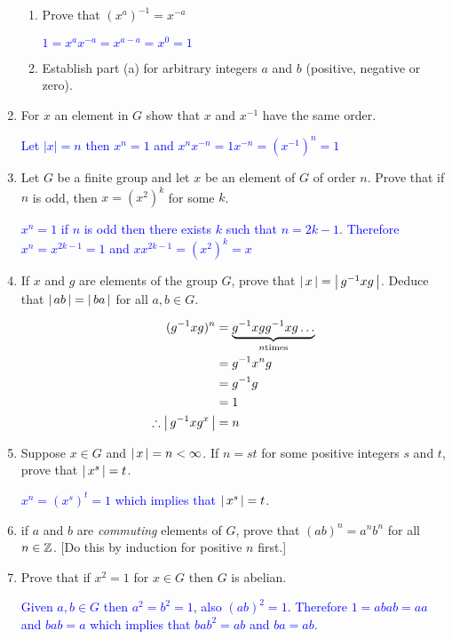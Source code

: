 \documentclass[10pt,a4paper]{report}
\newcommand{\BLUE}[1]{\textcolor{blue}{#1}}
\begin{document}
\begin{enumerate}
\begin{enumerate}
		\item Prove that $(x^a)^{-1}=x^{-a}$
		
		\BLUE{$1=x^ax^{-a}=x^{a-a}=x^0=1$ 
		}
		
		\item Establish part (a) for arbitrary integers $a$ and $b$ (positive, negative or zero).
	\end{enumerate}
	
	\item For $x$ an element in $G$ show that $x$ and $x^{-1}$ have the same order.
	
	\BLUE{Let $|x|=n$ then $x^n = 1$ and $x^nx^{-n} = 1x^{-n} =(x^{-1})^n = 1$ }
	
	\item Let $G$ be a finite group and let $x$ be an element of $G$ of order $n$.  Prove that if $n$ is odd, then $x=(x^2)^k$ for some $k$.
	
	\BLUE{ $x^n=1$ if $n$ is odd then there exists $k$ such that $n=2k-1$.  Therefore $x^n=x^{2k-1}=1$ and $xx^{2k-1}=(x^2)^k=x$
	}
	
	\item If $x$ and $g$ are elements of the group $G$, prove that $\left |\, x \,\right |=\left |\, g^{-1}xg \,\right |$.  Deduce that $\left |\, ab \,\right |= \left |\, ba \,\right |$ for all $a,b \in G$.
	
	\BLUE{\begin{align*}
		(g^{-1}xg)^n &= \underbrace{g^{-1}xgg^{-1}xg\dots}_{n\text{times}} \\
			&= g^{-1}x^n g \\
			&= g^{-1}g\\
			&= 1\\
		\therefore \left |\, g^{-1}xg^x \,\right | &= n
	\end{align*}
	}
	
	\item Suppose $x \in G$ and $\left |\, x \,\right |=n<\infty$.  If $n=st$ for some positive integers $s$ and $t$, prove that $\left |\, x^s \,\right |=t$.
	
	\BLUE{$x^n=(x^s)^t = 1$ which implies that $\left |\, x^s \,\right | = t$.
	}
	
	\item if $a$ and $b$ are \textit{commuting} elements of $G$, prove that $(ab)^n=a^nb^n$ for all $n \in \mathbb{Z}$.  [Do this by induction for positive $n$ first.]
	
	\item Prove that if $x^2=1$ for $x \in G$ then $G$ is abelian.
	
	\BLUE{Given $a,b \in G$ then $a^2=b^2=1$, also $(ab)^2=1$.  Therefore $1=abab=aa$ and $bab=a$ which implies that $bab^2=ab$ and $ba=ab$.
	}
	

\end{enumerate}
\end{document}

